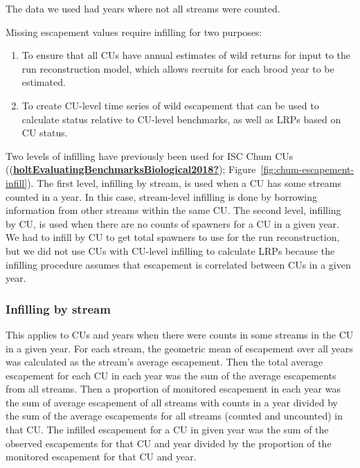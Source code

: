 \documentclass[11pt]{book}
\begin{document}
The data we used had years where not all streams were counted.

Missing escapement values require infilling for two purposes:
\begin{enumerate}
\def\labelenumi{\arabic{enumi}.}

\item
  To ensure that all CUs have annual estimates of wild returns for input to the run reconstruction model, which allows recruits for each brood year to be estimated.
\item
  To create CU-level time series of wild escapement that can be used to calculate status relative to CU-level benchmarks, as well as LRPs based on CU status.
\end{enumerate}
Two levels of infilling have previously been used for ISC Chum CUs ((\protect\hyperlink{ref-holtEvaluatingBenchmarksBiological2018}{\textbf{holtEvaluatingBenchmarksBiological2018?}}); Figure~\ref{fig:chum-escapement-infill}). The first level, infilling by stream, is used when a CU has some streams counted in a year. In this case, stream-level infilling is done by borrowing information from other streams within the same CU. The second level, infilling by CU, is used when there are no counts of spawners for a CU in a given year. We had to infill by CU to get total spawners to use for the run reconstruction, but we did not use CUs with CU-level infilling to calculate LRPs because the infilling procedure assumes that escapement is correlated between CUs in a given year.

\hypertarget{infilling-by-stream}{%
\subsubsection{Infilling by stream}\label{infilling-by-stream}}

This applies to CUs and years when there were counts in some streams in the CU in a given year. For each stream, the geometric mean of escapement over all years was calculated as the stream's average escapement. Then the total average escapement for each CU in each year was the sum of the average escapements from all streams. Then a proportion of monitored escapement in each year was the sum of average escapement of all streams with counts in a year divided by the sum of the average escapements for all streams (counted and uncounted) in that CU. The infilled escapement for a CU in given year was the sum of the observed escapements for that CU and year divided by the proportion of the monitored escapement for that CU and year.
\end{document}
